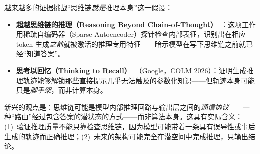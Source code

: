 越来越多的证据挑战“思维链\emph{就是}推理本身”这一假设：
\begin{itemize}
  \item \textbf{超越思维链的推理（Reasoning Beyond Chain-of-Thought）}~\cite{reasoning_latent2025}：这项工作用稀疏自编码器（Sparse Autoencoder）探针检查内部表征，识别出在相应 token 生成\emph{之前}就被激活的推理专用特征——暗示模型在写下思维链之前就已经“知道答案”。
  \item \textbf{思考以回忆（Thinking to Recall）}~\cite{thinking_recall2026}（Google，COLM 2026）：证明生成推理轨迹能够解锁那些直接提示几乎无法触及的参数化知识——但轨迹本身可能只是\emph{脚手架}，而非计算本身。
\end{itemize}

\begin{intuitionbox}[把思维链视为通信协议]
新兴的观点是：思维链可能是模型内部推理回路与输出层之间的\emph{通信协议}——一种“路由”经过包含答案的潜状态的方式——而非算法本身。这具有实际含义：(1)~验证推理质量不能只靠检查思维链，因为模型可能带着一条具有误导性或事后生成的轨迹而正确推理；(2)~未来的架构可能完全在潜空间中完成推理，只输出结论。
\end{intuitionbox}

